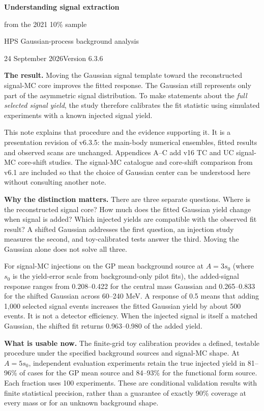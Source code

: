 \documentclass[11pt]{article}
\begin{document}
{\LARGE\bfseries Understanding signal extraction\par from the 2021 10\% sample}\par
{\large HPS Gaussian-process background analysis}\par
24 September 2026\hfill Version 6.3.6

\textbf{The result.} Moving the Gaussian signal template toward the reconstructed signal-MC core improves the fitted response. The Gaussian still represents only part of the asymmetric signal distribution. To make statements about the \emph{full selected signal yield}, the study therefore calibrates the fit statistic using simulated experiments with a known injected signal yield.

This note explains that procedure and the evidence supporting it. It is a presentation revision of v6.3.5: the main-body numerical ensembles, fitted results and observed scans are unchanged. Appendices A--C add v16 TC and UC signal-MC core-shift studies. The signal-MC catalogue and core-shift comparison from v6.1 are included so that the choice of Gaussian center can be understood here without consulting another note.

\textbf{Why the distinction matters.} There are three separate questions. Where is the reconstructed signal core? How much does the fitted Gaussian yield change when signal is added? Which injected yields are compatible with the observed fit result? A shifted Gaussian addresses the first question, an injection study measures the second, and toy-calibrated tests answer the third. Moving the Gaussian alone does not solve all three.

For signal-MC injections on the GP mean background source at $A=3s_0$ (where $s_0$ is the yield-error scale from background-only pilot fits), the added-signal response ranges from 0.208--0.422 for the central mass Gaussian and 0.265--0.833 for the shifted Gaussian across 60--240 MeV. A response of 0.5 means that adding 1,000 selected signal events increases the fitted Gaussian yield by about 500 events. It is not a detector efficiency. When the injected signal is itself a matched Gaussian, the shifted fit returns 0.963--0.980 of the added yield.

\textbf{What is usable now.} The finite-grid toy calibration provides a defined, testable procedure under the specified background sources and signal-MC shape. At $A=5s_0$, independent evaluation experiments retain the true injected yield in 81--96\% of cases for the GP mean source and 84--93\% for the functional form source. Each fraction uses 100 experiments. These are conditional validation results with finite statistical precision, rather than a guarantee of exactly 90\% coverage at every mass or for an unknown background shape.
\end{document}
